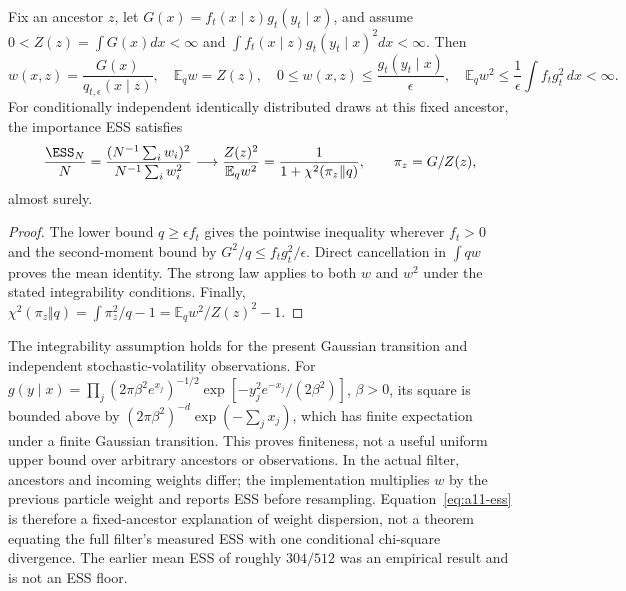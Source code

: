 \begin{proposition}
\label{prop:a11-weights}
Fix an ancestor $z$, let $G(x)=f_t(x\mid z)g_t(y_t\mid x)$, and assume
$0<Z(z)=\int G(x)dx<\infty$ and
$\int f_t(x\mid z)g_t(y_t\mid x)^2dx<\infty$. Then
\begin{equation}
 w(x,z)=\frac{G(x)}{q_{t,\epsilon}(x\mid z)},\quad
 \mathbb E_q w=Z(z),\quad
 0\le w(x,z)\le\frac{g_t(y_t\mid x)}{\epsilon},\quad
 \mathbb E_qw^2\le\frac1\epsilon\int f_tg_t^2\,dx<\infty.
 \label{eq:a11-weights}
\end{equation}
For conditionally independent identically distributed draws at this fixed
ancestor, the importance ESS satisfies
\begin{equation}
 \frac{\ESS_N}{N}
 =\frac{(N^{-1}\sum_iw_i)^2}{N^{-1}\sum_iw_i^2}
 \longrightarrow \frac{Z(z)^2}{\mathbb E_qw^2}
 =\frac1{1+\chi^2(\pi_z\Vert q)},\qquad
 \pi_z=G/Z(z),
 \label{eq:a11-ess}
\end{equation}
almost surely.
\end{proposition}
\begin{proof}
The lower bound $q\ge\epsilon f_t$ gives the pointwise inequality wherever
$f_t>0$ and the second-moment bound by
$G^2/q\le f_tg_t^2/\epsilon$. Direct cancellation in $\int qw$ proves the
mean identity. The strong law applies to both $w$ and $w^2$ under the stated
integrability conditions. Finally,
$\chi^2(\pi_z\Vert q)=\int\pi_z^2/q-1
=\mathbb E_qw^2/Z(z)^2-1$.
\end{proof}

The integrability assumption holds for the present Gaussian transition and
independent stochastic-volatility observations. For
$g(y\mid x)=\prod_j(2\pi\beta^2 e^{x_j})^{-1/2}
\exp[-y_j^2e^{-x_j}/(2\beta^2)]$, $\beta>0$, its square is bounded above by
$(2\pi\beta^2)^{-d}\exp(-\sum_jx_j)$, which has finite expectation under a
finite Gaussian transition. This proves finiteness, not a useful uniform
upper bound over arbitrary ancestors or observations. In the actual filter,
ancestors and incoming weights differ; the implementation multiplies $w$
by the previous particle weight and reports ESS before resampling.
Equation~\eqref{eq:a11-ess} is therefore a fixed-ancestor explanation of
weight dispersion, not a theorem equating the full filter's measured ESS
with one conditional chi-square divergence. The earlier mean ESS of roughly
$304/512$ was an empirical result and is not an ESS floor.

